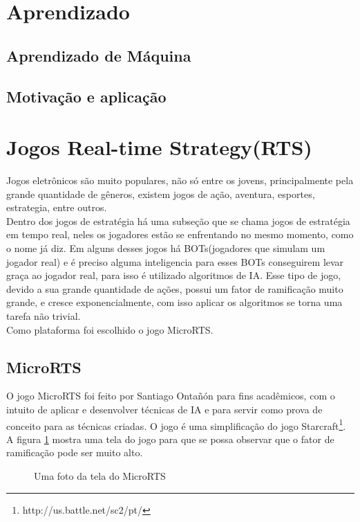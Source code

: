 \section{Aprendizado} 

\subsection{Aprendizado de Máquina} 


\subsection{Motivação e aplicação}


\section{Jogos Real-time Strategy(RTS)} 

Jogos eletrônicos são muito populares, não só entre os jovens, principalmente pela grande quantidade de gêneros, existem jogos de ação, aventura, esportes, estrategia, entre outros. \\
Dentro dos jogos de estratégia há uma subseção que se chama jogos de estratégia em tempo real, neles os jogadores estão se enfrentando no mesmo momento, como o nome já diz. Em alguns desses jogos há BOTs(jogadores que simulam um jogador real) e é preciso alguma inteligencia para esses BOTs conseguirem levar graça ao jogador real, para isso é utilizado algoritmos de IA. Esse tipo de jogo, devido a sua grande quantidade de ações, possui um fator de ramificação muito grande, e cresce exponencialmente, com isso aplicar os algoritmos se torna uma tarefa não trivial.  \\
Como plataforma foi escolhido o jogo MicroRTS. 

\subsection{MicroRTS} 
O jogo MicroRTS foi feito por Santiago Ontañón \cite{ontanon2013combinatorial} para fins acadêmicos, com o intuito de aplicar e desenvolver técnicas de IA e para servir como prova de conceito para as técnicas criadas.  O jogo é uma simplificação do jogo Starcraft\footnote{http://us.battle.net/sc2/pt/}.
A figura \ref{fig:microrts} mostra uma tela do jogo para que se possa observar que o fator de ramificação pode ser muito alto.

\begin{figure}[ht]
	\centering
	\caption{Uma foto da tela do MicroRTS}
	\label{fig:microrts}
\end{figure} 

